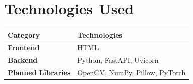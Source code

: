 \documentclass[12pt]{article}
\begin{document}
\section{Technologies Used}

\begin{table}[h]
\centering
\begin{tabular}{>{\bfseries}l l}
\toprule
Category & Technologies \\
\midrule
Frontend & HTML \\
\addlinespace
Backend & Python, FastAPI, Uvicorn \\
\addlinespace
Planned Libraries & OpenCV, NumPy, Pillow, PyTorch \\
\bottomrule
\end{tabular}
\end{table}
\end{document}
